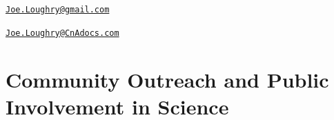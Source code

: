 \documentclass[12pt,twoside,letterpaper]{article}
\begin{document}


\vspace{-10mm}


\vspace{-7mm}


\vspace{-7mm}


\newpage


\vspace*{-30mm}\hfill\href{mailto:Joe.Loughry@gmail.com}%
{\nolinkurl{Joe.Loughry@gmail.com}}

\vspace*{-7mm}


\vspace{-7mm}


\vspace{-7mm}


\vspace{-7mm}


\vspace{-7mm}


\vspace{-7mm}


\vspace{3mm}

\noindent


\newpage


\vspace*{-23mm}\hfill\href{mailto:Joe.Loughry@CnAdocs.com}%
{\nolinkurl{Joe.Loughry@CnAdocs.com}}

\vspace{-3mm}
\section*{Community Outreach and Public Involvement in Science}
\vspace{2mm}
\end{document}
